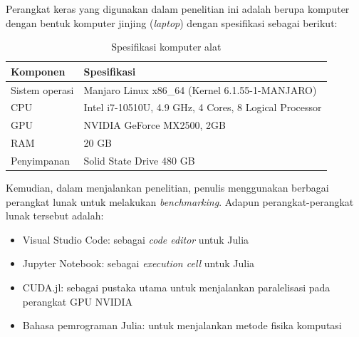 Perangkat keras yang digunakan dalam penelitian ini adalah berupa komputer
dengan bentuk komputer jinjing (\emph{laptop}) dengan spesifikasi sebagai
berikut:

\begin{table}[H]
	\centering
	\caption{Spesifikasi komputer alat}
	\begin{tabular}{|M{5cm}|M{8cm}|}
		\hline
		\textbf{Komponen} & \textbf{Spesifikasi}                                   \\
		\hline
		Sistem operasi    & Manjaro Linux x86\_64 (Kernel 6.1.55-1-MANJARO)        \\
		\hline
		CPU               & Intel i7-10510U, 4.9 GHz, 4 Cores, 8 Logical Processor \\
		\hline
		GPU               & NVIDIA GeForce MX2500, 2GB                             \\
		\hline
		RAM               & 20 GB                                                  \\
		\hline
		Penyimpanan       & Solid State Drive 480 GB                               \\
		\hline
	\end{tabular}
\end{table}

Kemudian, dalam menjalankan penelitian, penulis menggunakan berbagai perangkat
lunak untuk melakukan \emph{benchmarking}. Adapun perangkat-perangkat lunak
tersebut adalah:
\begin{itemize}
	\item Visual Studio Code: sebagai \emph{code editor} untuk Julia

	\item Jupyter Notebook: sebagai \emph{execution cell} untuk Julia

	\item CUDA.jl: sebagai pustaka utama untuk menjalankan paralelisasi pada
	      perangkat GPU NVIDIA

	\item Bahasa pemrograman Julia: untuk menjalankan metode fisika komputasi

\end{itemize}


